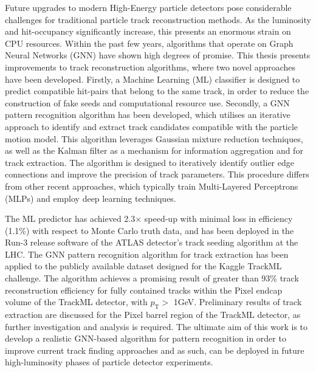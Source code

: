 Future upgrades to modern High-Energy particle detectors pose considerable challenges for traditional particle track reconstruction methods. As the luminosity and hit-occupancy significantly increase, this presents an enormous strain on CPU resources. Within the past few years, algorithms that operate on Graph Neural Networks (GNN) have shown high degrees of promise. This thesis presents improvements to track reconstruction algorithms, where two novel approaches have been developed. Firstly, a Machine Learning (ML) classifier is designed to predict compatible hit-pairs that belong to the same track, in order to reduce the construction of fake seeds and computational resource use. Secondly, a GNN pattern recognition algorithm has been developed, which utilises an iterative approach to identify and extract track candidates compatible with the particle motion model. This algorithm leverages Gaussian mixture reduction techniques, as well as the Kalman filter as a mechanism for information aggregation and for track extraction. The algorithm is designed to iteratively identify outlier edge connections and improve the precision of track parameters. This procedure differs from other recent approaches, which typically train Multi-Layered Perceptrons (MLPs) and employ deep learning techniques. 

The ML predictor has achieved 2.3$\times$ speed-up with minimal loss in efficiency (1.1\%) with respect to Monte Carlo truth data, and has been deployed in the Run-3 release software of the ATLAS detector’s track seeding algorithm at the LHC. The GNN pattern recognition algorithm for track extraction has been applied to the publicly available dataset designed for the Kaggle TrackML challenge. The algorithm achieves a promising result of greater than 93\% track reconstruction efficiency for fully contained tracks within the Pixel endcap volume of the TrackML detector, with $p_{\text{T}} >$ 1GeV. Preliminary results of track extraction are discussed for the Pixel barrel region of the TrackML detector, as further investigation and analysis is required. The ultimate aim of this work is to develop a realistic GNN-based algorithm for pattern recognition in order to improve current track finding approaches and as such, can be deployed in future high-luminosity phases of particle detector experiments.
